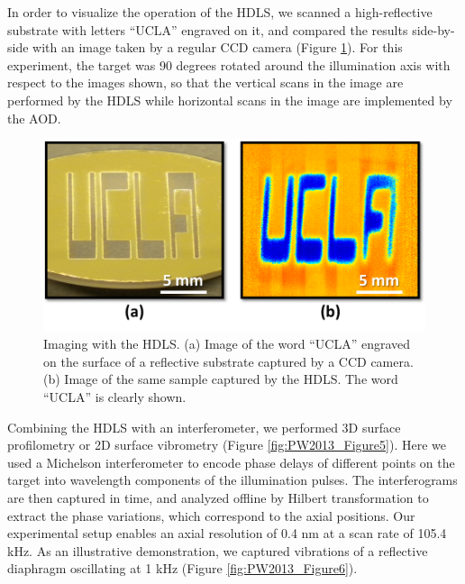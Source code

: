 In order to visualize the operation of the HDLS, we scanned a high-reflective substrate with letters “UCLA” engraved on it, and compared the results side-by-side with an image taken by a regular CCD camera (Figure \ref{fig:PW2013_Figure4}). For this experiment, the target was 90 degrees rotated around the illumination axis with respect to the images shown, so that the vertical scans in the image are performed by the HDLS while horizontal scans in the image are implemented by the AOD.

\begin{figure}[htb!]
\centering
\includegraphics[scale=0.9]{PW2013/Figure4.png}
\caption{Imaging with the HDLS. (a) Image of the word “UCLA” engraved on the surface of a reflective substrate captured by a CCD camera. (b) Image of the same sample captured by the HDLS. The word “UCLA” is clearly shown.}
\label{fig:PW2013_Figure4}
\end{figure}

Combining the HDLS with an interferometer, we performed 3D surface profilometry or 2D surface vibrometry (Figure \ref{fig:PW2013_Figure5}). Here we used a Michelson interferometer to encode phase delays of different points on the target into wavelength components of the illumination pulses. The interferograms are then captured in time, and analyzed offline by Hilbert transformation to extract the phase variations, which correspond to the axial positions. Our experimental setup enables an axial resolution of 0.4 nm at a scan rate of 105.4 kHz. As an illustrative demonstration, we captured vibrations of a reflective diaphragm oscillating at 1 kHz (Figure \ref{fig:PW2013_Figure6}).
 

